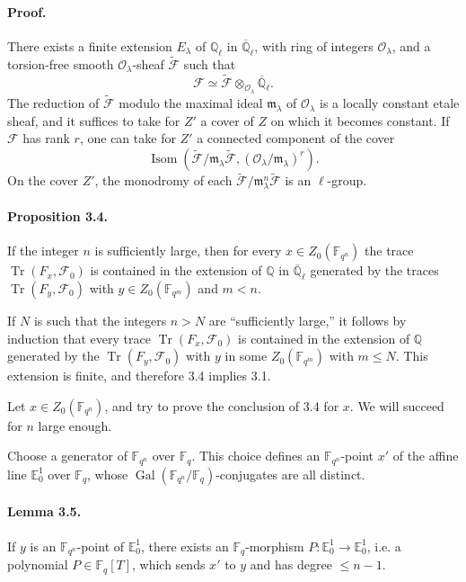 \documentclass[10pt]{article}
\newcommand{\F}{\mathbb{F}}
\newcommand{\Q}{\mathbb{Q}}
\newcommand{\Ql}{\overline{\mathbb Q}_{\ell}}
\newcommand{\Tr}{\operatorname{Tr}}
\newcommand{\Gal}{\operatorname{Gal}}
\newcommand{\Isom}{\operatorname{Isom}}
\begin{document}
\paragraph{Proof.}
There exists a finite extension $E_\lambda$ of $\mathbb Q_\ell$ in $\Ql$, with ring of integers $\mathcal O_\lambda$, and a torsion-free smooth $\mathcal O_\lambda$-sheaf $\widetilde{\mathcal F}$ such that
\[
 \mathcal F\simeq \widetilde{\mathcal F}\otimes_{\mathcal O_\lambda}\Ql.
\]
The reduction of $\widetilde{\mathcal F}$ modulo the maximal ideal $\mathfrak m_\lambda$ of $\mathcal O_\lambda$ is a locally constant etale sheaf, and it suffices to take for $Z'$ a cover of $Z$ on which it becomes constant.
If $\mathcal F$ has rank $r$, one can take for $Z'$ a connected component of the cover
\[
 \Isom\left(\widetilde{\mathcal F}/\mathfrak m_\lambda\widetilde{\mathcal F},(\mathcal O_\lambda/\mathfrak m_\lambda)^r\right).
\]
On the cover $Z'$, the monodromy of each $\widetilde{\mathcal F}/\mathfrak m_\lambda^n\widetilde{\mathcal F}$ is an $\ell$-group.

\paragraph{Proposition 3.4.}
If the integer $n$ is sufficiently large, then for every $x\in Z_0(\F_{q^n})$ the trace $\Tr(F_x,\mathcal F_0)$ is contained in the extension of $\Q$ in $\Ql$ generated by the traces $\Tr(F_y,\mathcal F_0)$ with $y\in Z_0(\F_{q^m})$ and $m<n$.

If $N$ is such that the integers $n>N$ are ``sufficiently large,'' it follows by induction that every trace $\Tr(F_x,\mathcal F_0)$ is contained in the extension of $\Q$ generated by the $\Tr(F_y,\mathcal F_0)$ with $y$ in some $Z_0(\F_{q^m})$ with $m\le N$.
This extension is finite, and therefore 3.4 implies 3.1.

Let $x\in Z_0(\F_{q^n})$, and try to prove the conclusion of 3.4 for $x$.
We will succeed for $n$ large enough.

Choose a generator of $\F_{q^n}$ over $\F_q$.
This choice defines an $\F_{q^n}$-point $x'$ of the affine line $\mathbb E^1_0$ over $\F_q$, whose $\Gal(\F_{q^n}/\F_q)$-conjugates are all distinct.

\paragraph{Lemma 3.5.}
If $y$ is an $\F_{q^n}$-point of $\mathbb E^1_0$, there exists an $\F_q$-morphism $P:\mathbb E^1_0\to\mathbb E^1_0$, i.e. a polynomial $P\in\F_q[T]$, which sends $x'$ to $y$ and has degree $\le n-1$.
\end{document}
